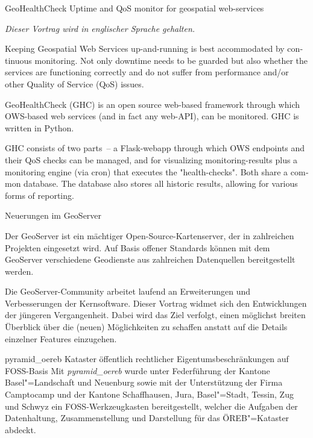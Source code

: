 %
{GeoHealthCheck}%
{Uptime and QoS monitor for geospatial web-services}%
{
  \emph{Dieser Vortrag wird in englischer Sprache gehalten.}

  \begin{otherlanguage}{english}
    Keeping Geospatial Web Services up-and-running is best accommodated by continuous monitoring.  Not
    only downtime needs to be guarded but also whether the services are functioning correctly and do not
    suffer from performance and/or other Quality of Service (QoS) issues.

    GeoHealthCheck (GHC) is an open source web-based framework
    through which OWS-based web services (and in fact any web-API), can be monitored.
    GHC is written in Python.
    
    GHC consists of two parts~-- a Flask-webapp through which OWS endpoints
    and their QoS checks can be managed, and for visualizing monitoring-results plus a monitoring engine
    (via cron) that executes the "health-checks".
    Both share a common database.
    The database also stores all historic results, allowing for various forms of reporting.
  \end{otherlanguage}%
}

%
{Neuerungen im GeoServer}%
{}%
{
Der GeoServer ist ein mächtiger Open-Source-Kartenserver, der in zahlreichen Projekten eingesetzt
wird. Auf Basis offener Standards können mit dem GeoServer verschiedene Geodienste aus zahlreichen
Datenquellen bereitgestellt werden.

Die GeoServer-Community arbeitet laufend an Erweiterungen und Verbesserungen der Kernsoftware.
Dieser Vortrag widmet sich den Entwicklungen der jüngeren Vergangenheit. Dabei wird das Ziel
verfolgt, einen möglichst breiten Überblick über die (neuen) Möglichkeiten zu schaffen anstatt auf
die Details einzelner Features einzugehen.%
}

%
{pyramid\_oereb}%
{Kataster öffentlich rechtlicher Eigentumsbeschränkungen auf FOSS-Basis}%
{
Mit \emph{pyramid\_oereb} wurde unter Federführung der Kantone Basel"=Landschaft und Neuenburg sowie
mit der Unterstützung der Firma Camptocamp und der Kantone Schaffhausen, Jura, Basel"=Stadt, Tessin,
Zug und Schwyz ein FOSS-Werkzeugkasten bereitgestellt, welcher die Aufgaben der Datenhaltung,
Zusammenstellung und Darstellung für das ÖREB"=Kataster abdeckt.%
}

